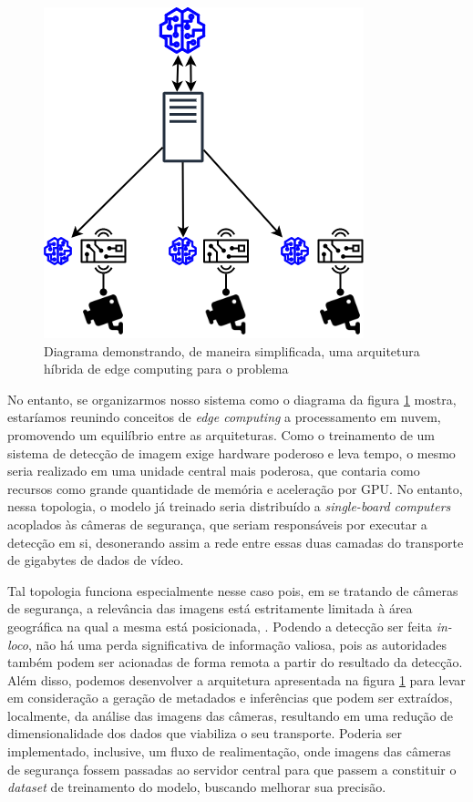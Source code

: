 \documentclass[]{politex}
\begin{document}
\begin{figure}[ht]
  \centering
  \includegraphics[scale=0.7]{img/diagrama.png}
  \caption{Diagrama demonstrando, de maneira simplificada, uma arquitetura híbrida de edge computing para o problema}
  \label{fig:diagramaarquitetura}
\end{figure}

No entanto, se organizarmos nosso sistema como o diagrama da figura \ref{fig:diagramaarquitetura} mostra, estaríamos reunindo conceitos de \textit{edge computing} a processamento em nuvem, promovendo um equilíbrio entre as arquiteturas. Como o treinamento de um sistema de detecção de imagem exige hardware poderoso e leva tempo, o mesmo seria realizado em uma unidade central mais poderosa, que contaria como recursos como grande quantidade de memória e aceleração por GPU. No entanto, nessa topologia, o modelo já treinado seria distribuído a \textit{single-board computers} acoplados às câmeras de segurança, que seriam responsáveis por executar a detecção em si, desonerando assim a rede entre essas duas camadas do transporte de gigabytes de dados de vídeo.

Tal topologia funciona especialmente nesse caso pois, em se tratando de câmeras de segurança, a relevância das imagens está estritamente limitada à área geográfica na qual a mesma está posicionada, . Podendo a detecção ser feita \textit{in-loco}, não há uma perda significativa de informação valiosa, pois as autoridades também podem ser acionadas de forma remota a partir do resultado da detecção. Além disso, podemos desenvolver a arquitetura apresentada na figura \ref{fig:diagramaarquitetura} para levar em consideração a geração de metadados e inferências que podem ser extraídos, localmente, da análise das imagens das câmeras, resultando em uma redução de dimensionalidade dos dados que viabiliza o seu transporte. Poderia ser implementado, inclusive, um fluxo de realimentação, onde imagens das câmeras de segurança fossem passadas ao servidor central para que passem a constituir o \textit{dataset} de treinamento do modelo, buscando melhorar sua precisão.
\end{document}
